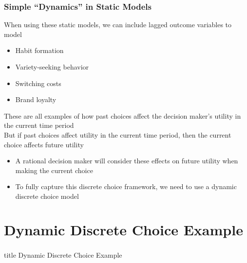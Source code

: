 \documentclass{beamer}
\begin{document}
\begin{frame}\frametitle{Simple ``Dynamics'' in Static Models}
    When using these static models, we can include lagged outcome variables to model
    \begin{itemize}
        \item Habit formation
        \item Variety-seeking behavior
        \item Switching costs
        \item Brand loyalty
    \end{itemize}
    \vspace{2ex}
    These are all examples of how past choices affect the decision maker's utility in the current time period \\
    \vspace{2ex}
    But if past choices affect utility in the current time period, then the current choice affects future utility
    \begin{itemize}
        \item A rational decision maker will consider these effects on future utility when making the current choice
        \item To fully capture this discrete choice framework, we need to use a dynamic discrete choice model
    \end{itemize}
\end{frame}

\section{Dynamic Discrete Choice Example}
\label{example}
\begin{frame}\frametitle{}
    \vfill
    \centering
    \begin{beamercolorbox}[center]{title}
        \Large Dynamic Discrete Choice Example
    \end{beamercolorbox}
    \vfill
\end{frame}
\end{document}
